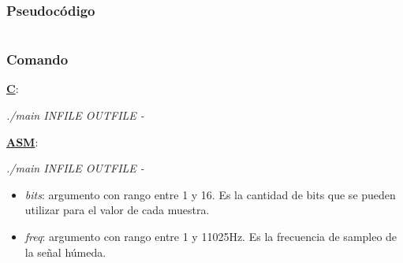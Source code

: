 \subsubsection{Pseudocódigo}
\label{subsec:desarrollo-bitcrusher-code}

\lstset{language=C}
\begin{lstlisting}[frame=single]
\end{lstlisting}

\subsubsection{Comando}
\label{subsec:desarrollo-bitcrusher-call}

\underline{\textbf{C}}:
\begin{center}
 \textit{./main INFILE OUTFILE -}
\end{center}

\underline{\textbf{ASM}}:
\begin{center}
 \textit{./main INFILE OUTFILE -}
\end{center}

\begin{itemize}
 \item \textit{bits}: argumento con rango entre 1 y 16. Es la cantidad de bits que se pueden utilizar para el valor de cada muestra.
 \item \textit{freq}: argumento con rango entre 1 y 11025Hz. Es la frecuencia de sampleo de la señal húmeda.
\end{itemize}
 
 
